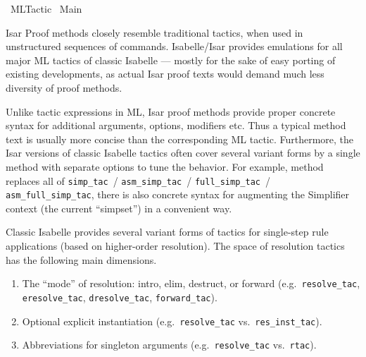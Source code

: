 %
\begin{isabellebody}%
\def\isabellecontext{ML{\isacharunderscore}Tactic}%
%
\isadelimtheory
\isanewline
\isanewline
%
\endisadelimtheory
%
\isatagtheory
{}\isamarkupfalse%
\ ML{\isacharunderscore}Tactic\isanewline
{}\ Main\isanewline
{}%
\endisatagtheory
{\isafoldtheory}%
%
\isadelimtheory
%
\endisadelimtheory
%
\isamarkuptrue%
%
\begin{isamarkuptext}%
Isar Proof methods closely resemble traditional tactics, when used
  in unstructured sequences of \mbox{} commands.
  Isabelle/Isar provides emulations for all major ML tactics of
  classic Isabelle --- mostly for the sake of easy porting of existing
  developments, as actual Isar proof texts would demand much less
  diversity of proof methods.

  Unlike tactic expressions in ML, Isar proof methods provide proper
  concrete syntax for additional arguments, options, modifiers etc.
  Thus a typical method text is usually more concise than the
  corresponding ML tactic.  Furthermore, the Isar versions of classic
  Isabelle tactics often cover several variant forms by a single
  method with separate options to tune the behavior.  For example,
  method \mbox{} replaces all of \verb|simp_tac|~/ \verb|asm_simp_tac|~/ \verb|full_simp_tac|~/ \verb|asm_full_simp_tac|, there
  is also concrete syntax for augmenting the Simplifier context (the
  current ``simpset'') in a convenient way.%
\end{isamarkuptext}%
\isamarkuptrue%
%
\isamarkuptrue%
%
\begin{isamarkuptext}%
Classic Isabelle provides several variant forms of tactics for
  single-step rule applications (based on higher-order resolution).
  The space of resolution tactics has the following main dimensions.

  \begin{enumerate}

  \item The ``mode'' of resolution: intro, elim, destruct, or forward
  (e.g.\ \verb|resolve_tac|, \verb|eresolve_tac|, \verb|dresolve_tac|,
  \verb|forward_tac|).

  \item Optional explicit instantiation (e.g.\ \verb|resolve_tac| vs.\
  \verb|res_inst_tac|).

  \item Abbreviations for singleton arguments (e.g.\ \verb|resolve_tac|
  vs.\ \verb|rtac|).


\end{enumerate}
\end{isamarkuptext}
\end{isabellebody}
